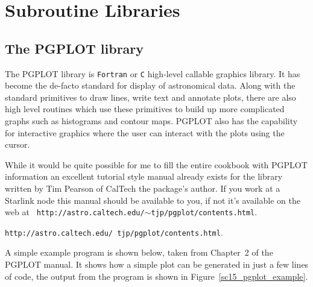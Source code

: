 \documentclass[twoside,11pt]{article}
\newcommand{\htmladdnormallink}[2]{#1}
\newcommand{\latex}[1]{#1}
\newcommand{\xlabel}[1]{}
\begin{document}
\section{\xlabel{sc15_libraries}Subroutine Libraries\label{sc15_libraries}}

\subsection{\xlabel{sc15_pgplot}The PGPLOT library\label{sc15_pgplot}}

The
\htmladdnormallink{PGPLOT}{http://astro.caltech.edu/~tjp/pgplot/index.html}
library is {\tt Fortran} or {\tt C} high-level callable graphics
library. It has become the de-facto standard for display of
astronomical data. Along with the standard primitives to draw lines,
write text and annotate plots, there are also high level routines
which use these primitives to build up more complicated graphs such as
histograms and contour maps. PGPLOT also has the capability for
interactive graphics where the user can interact with the plots using
the cursor.

While it would be quite possible for me to fill the entire cookbook
with PGPLOT information an excellent tutorial style manual already
exists for the library written by \htmladdnormallink{Tim
Pearson}{mailto:tjp@astro.caltech.edu} of CalTech the package's
author. If you work at a Starlink node this manual should be available
to you, if not it's available on the web at \latex{{\tt
http://astro.caltech.edu/$\sim$tjp/pgplot/contents.html}.}
\begin{htmlonly}
\htmladdnormallink{{\tt http://astro.caltech.edu/~tjp/pgplot/contents.html}}{http://astro.caltech.edu/~tjp/pgplot/contents.html}.
\end{htmlonly}

A simple example program is shown below, taken from
\htmladdnormallink{Chapter~2}{http://astro.caltech.edu/~tjp/pgplot/chapter2.html}
of the PGPLOT manual. It shows how a simple plot can be generated in
just a few lines of code, the output from the program is shown in
Figure~\ref{sc15_pgplot_example}.
\end{document}
